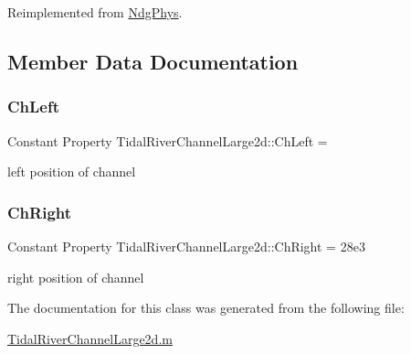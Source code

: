 Reimplemented from \hyperlink{class_ndg_phys_a5cd323275f4098db166471c4b078ed17}{Ndg\+Phys}.



\subsection{Member Data Documentation}
\mbox{\label{class_tidal_river_channel_large2d_a3c12f6ce2777a89e264feb2013c2e6e9}} 
\subsubsection{\texorpdfstring{Ch\+Left}{ChLeft}}
{\footnotesize\ttfamily Constant Property Tidal\+River\+Channel\+Large2d\+::\+Ch\+Left =}



left position of channel 

\mbox{\label{class_tidal_river_channel_large2d_a210e3b20bcb12be6d54122663051b242}} 
\subsubsection{\texorpdfstring{Ch\+Right}{ChRight}}
{\footnotesize\ttfamily Constant Property Tidal\+River\+Channel\+Large2d\+::\+Ch\+Right = 28e3}



right position of channel 



The documentation for this class was generated from the following file\+:\begin{DoxyCompactItemize}
\item 
\hyperlink{_tidal_river_channel_large2d_8m}{Tidal\+River\+Channel\+Large2d.\+m}\end{DoxyCompactItemize}
